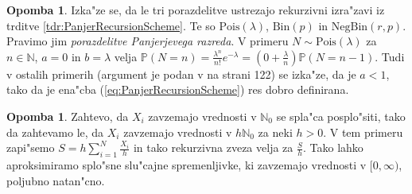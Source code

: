 \documentclass[12pt, a4paper, reqno]{amsart}
\theoremstyle{definition}
\newtheorem{opomba}[definicija]{Opomba}
\theoremstyle{plain}
\newcommand{\N}{\mathbb{N}}
\newcommand{\Prob}{\mathbb{P}}
\newcommand{\1}{\mathds{1}}
\newcommand{\Pois}[1]{\text{Pois}(#1)}
\begin{document}
    \begin{opomba}
        Izka"ze se, da le tri porazdelitve 
        ustrezajo rekurzivni izra"zavi iz trditve \ref{tdr:PanjerRecursionScheme}. Te so $\Pois{\lambda}$, $\text{Bin}(p)$ in
        $\text{NegBin}(r, p)$. Pravimo jim \textit{porazdelitve Panjerjevega razreda}. V primeru $N\sim\Pois{\lambda}$ za $n\in\N$, $a = 0$ in $b = \lambda$ velja $\Prob\left(N = n\right) = \frac{\lambda^n}{n!}e^{-\lambda} = 
        \left(0 + \frac{\lambda}{n}\right)\Prob\left(N = n - 1\right)$. 
        Tudi v ostalih primerih (argument je podan v \cite{4} na strani 122) se izka"ze, da je $a < 1$, tako da je 
        ena"cba (\ref{eq:PanjerRecursionScheme}) res dobro definirana.
        \label{op:PanjerRazsiritev}
    \end{opomba}

    \begin{opomba}
        Zahtevo, da $X_i$ zavzemajo vrednosti v $\N_0$ se spla"ca posplo"siti, tako da 
        zahtevamo le, da $X_i$ zavzemajo vrednosti v $h\N_0$ za neki $h>0$. V tem primeru 
        zapi"semo $S = h\sum_{i=1}^N\frac{X_i}{h}$ in tako rekurzivna zveza velja za $\frac{S}{h}$. 
        Tako lahko aproksimiramo splo"sne slu"cajne 
        spremenljivke, ki zavzemajo vrednosti v $[0, \infty)$, poljubno natan"cno.
    \end{opomba}  
\end{document}
